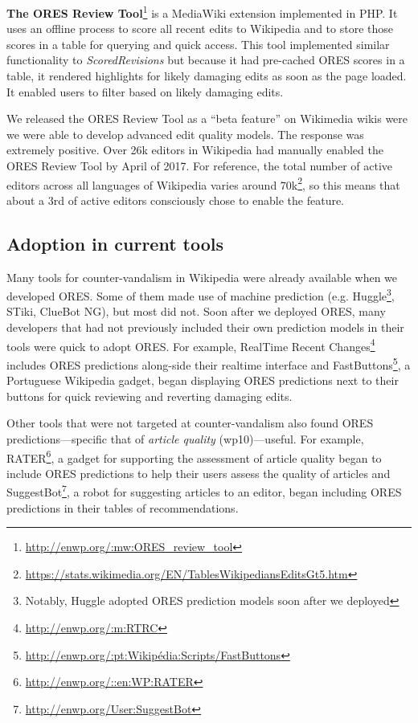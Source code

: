 \textbf{The ORES Review Tool}\footnote{\url{http://enwp.org/:mw:ORES_review_tool}} is a MediaWiki extension implemented in PHP.  It uses an offline process to score all recent edits to Wikipedia and to store those scores in a table for querying and quick access.  This tool implemented similar functionality to \emph{ScoredRevisions} but because it had pre-cached ORES scores in a table, it rendered highlights for likely damaging edits as soon as the page loaded. It enabled users to filter based on likely damaging edits.

We released the ORES Review Tool as a ``beta feature'' on Wikimedia wikis were we were able to develop advanced edit quality models.  The response was extremely positive.  Over 26k editors in Wikipedia had manually enabled the ORES Review Tool by April of 2017.  For reference, the total number of active editors across all languages of Wikipedia varies around 70k\footnote{\url{https://stats.wikimedia.org/EN/TablesWikipediansEditsGt5.htm}}, so this means that about a 3rd of active editors consciously chose to enable the feature.

\subsection{Adoption in current tools}
Many tools for counter-vandalism in Wikipedia were already available when we developed ORES.  Some of them made use of machine prediction (e.g. Huggle\footnote{Notably, Huggle adopted ORES prediction models soon after we deployed}, STiki, ClueBot NG), but most did not.  Soon after we deployed ORES, many developers that had not previously included their own prediction models in their tools were quick to adopt ORES.  For example, RealTime Recent Changes\footnote{\url{http://enwp.org/:m:RTRC}} includes ORES predictions along-side their realtime interface and FastButtons\footnote{\url{http://enwp.org/:pt:Wikipédia:Scripts/FastButtons}}, a Portuguese Wikipedia gadget, began displaying ORES predictions next to their buttons for quick reviewing and reverting damaging edits.

Other tools that were not targeted at counter-vandalism also found ORES predictions---specific that of \emph{article quality} (wp10)---useful.  For example, RATER\footnote{\url{http://enwp.org/::en:WP:RATER}}, a gadget for supporting the assessment of article quality began to include ORES predictions to help their users assess the quality of articles and SuggestBot\footnote{\url{http://enwp.org/User:SuggestBot}}\cite{cosley2007suggestbot}, a robot for suggesting articles to an editor, began including ORES predictions in their tables of recommendations.

